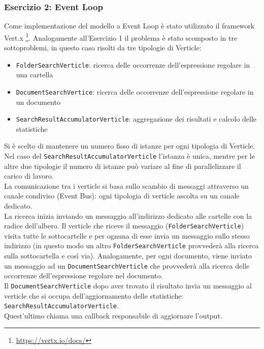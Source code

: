 \documentclass[a4paper]{article}
\begin{document}
\subsubsection{Esercizio 2: Event Loop}
Come implementazione del modello a Event Loop è stato utilizzato il framework Vert.x \footnote{\url{https://vertx.io/docs/}}.
Analogamente all'Esercizio 1 il problema è stato scomposto in tre sottoproblemi, in questo caso risolti da tre tipologie di Verticle:
\begin{itemize}
    \item \texttt{FolderSearchVerticle}: ricerca delle occorrenze dell'espressione regolare in una cartella
    \item \texttt{DocumentSearchVertice}: ricerca delle occorrenze dell'espressione regolare in un documento
    \item \texttt{SearchResultAccumulatorVerticle}: aggregazione dei risultati e calcolo delle statistiche
\end{itemize}
Si è scelto di mantenere un numero fisso di istanze per ogni tipologia di Verticle. Nel caso del \texttt{SearchResultAccumulatorVerticle} l'istanza è unica, mentre per le altre due tipologie il numero di istanze può variare al fine di parallelizzare il carico di lavoro.\\
La comunicazione tra i verticle si basa sullo scambio di messaggi attraverso un canale condiviso (Event Bus): ogni tipologia di verticle ascolta su un canale dedicato.\\
La ricerca inizia inviando un messaggio all'indirizzo dedicato alle cartelle con la radice dell'albero.
Il verticle che riceve il messaggio (\texttt{FolderSearchVerticle}) visita tutte le sottocartelle e per ognuna di esse invia un messaggio sullo stesso indirizzo (in questo modo un altro \texttt{FolderSearchVerticle} provvederà alla ricerca sulla sottocartella e così via).
Analogamente, per ogni documento, viene inviato un messaggio ad un \texttt{DocumentSearchVerticle} che provvederà alla ricerca delle occorrenze dell'espressione regolare nel documento.\\
Il \texttt{DocumentSearchVerticle} dopo aver trovato il risultato invia un messaggio al verticle che si occupa dell'aggiornamento delle statistiche:\\ \texttt{SearchResultAccumulatorVerticle}.\\
Quest'ultimo chiama una callback responsabile di aggiornare l'output.
\end{document}
